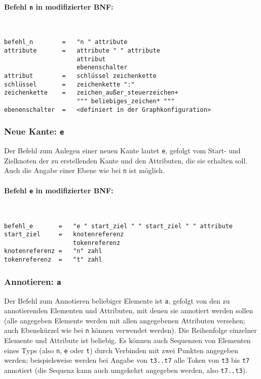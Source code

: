 \documentclass[12pt]{scrartcl}
\begin{document}
\paragraph*{Befehl \texttt{n} in modifizierter BNF:}
~
\begin{framed}
\begin{lstlisting}
befehl_n        =   "n " attribute
attribute       =   attribute " " attribute
                    attribut
                    ebenenschalter
attribut        =   schlüssel zeichenkette
schlüssel       =   zeichenkette ":"
zeichenkette    =   zeichen_außer_steuerzeichen+
                    """ beliebiges_zeichen* """
ebenenschalter  =   <definiert in der Graphkonfiguration>
\end{lstlisting}
\end{framed}


\subsubsection{Neue Kante: \texttt{e}}

Der Befehl zum Anlegen einer neuen Kante lautet \texttt{e}, gefolgt vom Start- und Zielknoten der zu erstellenden  Kante und den Attributen, die sie erhalten soll. Auch die Angabe einer Ebene wie bei \texttt{n} ist möglich.

\paragraph*{Befehl \texttt{e} in modifizierter BNF:}
~
\begin{framed}
\begin{lstlisting}
befehl_e       =   "e " start_ziel " " start_ziel " " attribute
start_ziel     =   knotenreferenz
                   tokenreferenz
knotenreferenz =   "n" zahl
tokenreferenz  =   "t" zahl
\end{lstlisting}
\end{framed}


\subsubsection{Annotieren: \texttt{a}}\label{befehl-a}

Der Befehl zum Annotieren beliebiger Elemente ist \texttt{a}, gefolgt von den zu annotierenden Elementen und Attributen, mit denen sie annotiert werden sollen (alle angegeben Elemente werden mit allen angegebenen Attributen versehen; auch Ebenekürzel wie bei \texttt{n} können verwendet werden). Die Reihenfolge einzelner Elemente und Attribute ist beliebig. Es können auch Sequenzen von Elementen eines Typs (also \texttt{n}, \texttt{e} oder \texttt{t}) durch Verbinden mit zwei Punkten angegeben werden; beispielsweise werden bei Angabe von \texttt{t3..t7} alle Token von \texttt{t3} bis \texttt{t7} annotiert (die Sequenz kann auch umgekehrt angegeben werden, also \texttt{t7..t3}).
\end{document}

